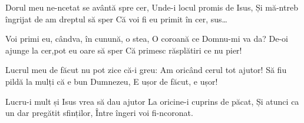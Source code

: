 
\beginverse
Dorul meu ne-ncetat se avântă spre cer,
Unde-i locul promis de Isus,
Și mă-ntreb îngrijat de am dreptul să sper
Că voi fi eu primit în cer, sus…
\endverse

\beginchorus
Voi primi eu, cândva, în cunună, o stea,
O coroană ce Domnu-mi va da?
De-oi ajunge la cer,pot eu oare să sper
Că primesc răsplătiri ce nu pier!
\endchorus

\beginverse
Lucrul meu de făcut nu pot zice că-i greu:
Am oricând cerul tot ajutor!
Să fiu pildă la mulți că e bun Dumnezeu,
E ușor de făcut, e ușor!
\endverse

\beginverse
Lucru-i mult și Isus vrea să dau ajutor
La oricine-i cuprins de păcat,
Și atunci ca un dar pregătit sfinților,
Între îngeri voi fi-ncoronat.
\endverse

\endsong

